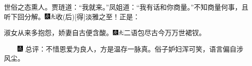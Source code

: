 {世俗之态熏人。}贾琏道：``我就来。''凤姐道：``我有话和你商量。''不知商量何事，且听下回分解。{\includegraphics[width=3mm]{../Images/00004}\includegraphics[width=3mm]{../Images/00012}\footnotesize \kaishu 收{(后)}{[}得{]}淡雅之至！}正是：

淑女从来多抱怨，娇妻自古便含酸。{\includegraphics[width=3mm]{../Images/00004}\includegraphics[width=3mm]{../Images/00012}\footnotesize \kaishu 二语包尽古今万万世裙钗。}

{　　\includegraphics[width=3mm]{../Images/00005}  \kaishu 总评：不惜恩爱为良人，方是温存一脉真。俗子妒妇浑可笑，语言偏自涉风尘。}


